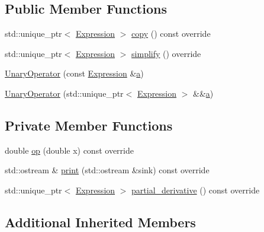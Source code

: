 \subsection*{Public Member Functions}
\begin{DoxyCompactItemize}
\item 
std\+::unique\+\_\+ptr$<$ \mbox{\hyperlink{classsymcpp_1_1Expression}{Expression}} $>$ \mbox{\hyperlink{classsymcpp_1_1Exponential_ad6ea3a357a471f75e28761c9a9f0d54d}{copy}} () const override
\item 
std\+::unique\+\_\+ptr$<$ \mbox{\hyperlink{classsymcpp_1_1Expression}{Expression}} $>$ \mbox{\hyperlink{classsymcpp_1_1Exponential_a099298ffa8721a8bb646d98518542d24}{simplify}} () override
\item 
\mbox{\hyperlink{classsymcpp_1_1Exponential_a23a8172db96675ebf1114f4f3f41b6f1}{Unary\+Operator}} (const \mbox{\hyperlink{classsymcpp_1_1Expression}{Expression}} \&\mbox{\hyperlink{classsymcpp_1_1UnaryOperator_a1558842963261562d2ef68e324822cba}{a}})
\item 
\mbox{\hyperlink{classsymcpp_1_1Exponential_ad3aa899567a080eeb41cb850de310178}{Unary\+Operator}} (std\+::unique\+\_\+ptr$<$ \mbox{\hyperlink{classsymcpp_1_1Expression}{Expression}} $>$ \&\&\mbox{\hyperlink{classsymcpp_1_1UnaryOperator_a1558842963261562d2ef68e324822cba}{a}})
\end{DoxyCompactItemize}
\subsection*{Private Member Functions}
\begin{DoxyCompactItemize}
\item 
double \mbox{\hyperlink{classsymcpp_1_1Exponential_aa36daedb8bf7bfe74f7f5ef85e448a7f}{op}} (double x) const override
\item 
std\+::ostream \& \mbox{\hyperlink{classsymcpp_1_1Exponential_a2af4d6f507139799516d960293f74343}{print}} (std\+::ostream \&sink) const override
\item 
std\+::unique\+\_\+ptr$<$ \mbox{\hyperlink{classsymcpp_1_1Expression}{Expression}} $>$ \mbox{\hyperlink{classsymcpp_1_1Exponential_a73f9208294626b48e2385a08e761b846}{partial\+\_\+derivative}} () const override
\end{DoxyCompactItemize}
\subsection*{Additional Inherited Members}


